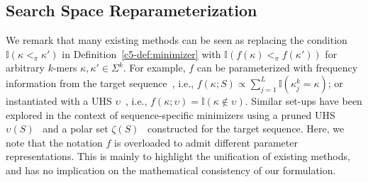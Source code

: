 \subsection{Search Space Reparameterization}
\label{c5-sec:searchspace}
We remark that many existing methods can be seen as replacing the condition $\mathbb{I}(\kappa <_{\pi} \kappa')$ in Definition~\ref{c5-def:minimizer} with $\mathbb{I}(f(\kappa) <_{\pi} f(\kappa'))$ for arbitrary $k$-mers $\kappa, \kappa' \in \Sigma^k$. For example, $f$ can be parameterized with frequency information from the target sequence~\citep{chikhi16,jain20b}, i.e., $f(\kappa; S) \propto \sum_{j=1}^{L} \mathbb{I}(\kappa^k_j = \kappa)$; or instantiated with a UHS $\upsilon$~\citep{ekim20pasha,zheng20miniception}, i.e., $f(\kappa; \upsilon) = \mathbb{I}(\kappa \not\in \upsilon)$. Similar set-ups have been explored in the context of sequence-specific minimizers using a pruned UHS $\upsilon(S)$~\citep{deblasio19} and a polar set $\zeta(S)$~\citep{zheng21} constructed for the target sequence. Here, we note that the notation $f$ is overloaded to admit different parameter representations. This is mainly to highlight the unification of existing methods, and has no implication on the mathematical consistency of our formulation.

